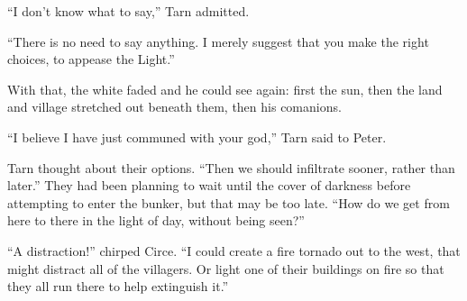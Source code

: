 ``I don't know what to say,'' Tarn admitted.

``There is no need to say anything.  I merely suggest that you make the right choices, to appease the Light.''

With that, the white faded and he could see again: first the sun, then the land and village stretched out beneath them, then his comanions.

``I believe I have just communed with your god,'' Tarn said to Peter.




Tarn thought about their options.  ``Then we should infiltrate sooner, rather than later.''  They had been planning to wait until the cover of darkness before attempting to enter the bunker, but that may be too late.  ``How do we get from here to there in the light of day, without being seen?''

``A distraction!'' chirped Circe.  ``I could create a fire tornado out to the west, that might distract all of the villagers.  Or light one of their buildings on fire so that they all run there to help extinguish it.''
